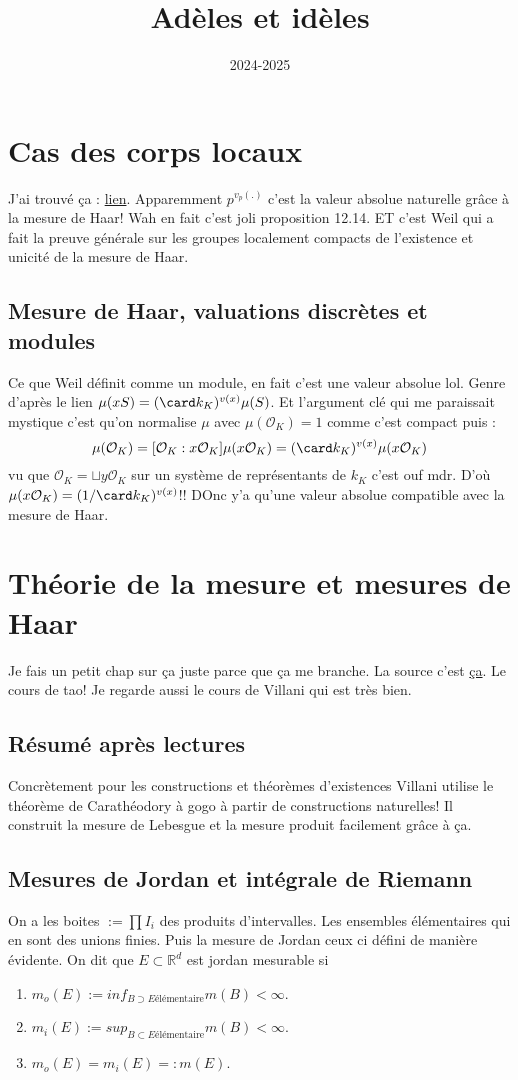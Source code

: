 \documentclass[a4paper,12pt]{book}
\title{Adèles et idèles}
\date{2024-2025}
\newcommand{\R}{\mathbb{R}}
\newcommand{\Or}{\mathcal{O}}
\theoremstyle{plain}
\theoremstyle{definition}
\theoremstyle{remark}
\begin{document}
\maketitle
\tableofcontents

\chapter{Cas des corps locaux}
J'ai trouvé ça : \href{https://math.mit.edu/classes/18.785/2015fa/LectureNotes12.pdf}{lien}.
Apparemment $p^{v_p(.)}$ c'est la valeur absolue naturelle grâce
à la mesure de Haar! Wah en fait c'est joli proposition 12.14. ET
c'est Weil qui a fait la preuve générale sur les groupes localement
compacts de l'existence et unicité de la mesure de Haar.
\section{Mesure de Haar, valuations discrètes et modules}
Ce que Weil définit comme un module, en fait c'est une valeur
absolue lol. Genre d'après le lien 
$\mu(xS)=(\card k_K)^{v(x)}\mu(S)$. Et l'argument clé qui me
paraissait mystique c'est qu'on normalise $\mu$ avec $\mu(\Or_K)=1$
comme c'est compact puis :
\[\mu(\Or_K)=[\Or_K:x\Or_K]\mu(x\Or_K)=(\card k_K)^{v(x)}\mu(x\Or_K)\]
vu que $\Or_K=\sqcup y\Or_K$ sur un système de représentants de
$k_K$ c'est ouf mdr. D'où $\mu(x\Or_K)=(1/\card k_K)^{v(x)}$!!
DOnc y'a qu'une valeur absolue compatible avec la mesure de Haar.


\chapter{Théorie de la mesure et mesures de Haar}
Je fais un petit chap sur ça juste parce que ça me branche.
La source c'est \href{https://terrytao.wordpress.com/wp-content/uploads/2012/12/gsm-126-tao5-measure-book.pdf}{ça}.
Le cours de tao! Je regarde aussi le cours de Villani qui est très
bien.
\section{Résumé après lectures}
Concrètement pour les constructions et théorèmes d'existences 
Villani utilise le théorème de Carathéodory à gogo à partir
de constructions naturelles! Il construit la mesure de Lebesgue
et la mesure produit facilement grâce à ça.

\section{Mesures de Jordan et intégrale de Riemann}
On a les boites $:=\prod I_i$ des produits d'intervalles. 
Les ensembles élémentaires qui en sont des unions finies.
Puis la mesure de Jordan ceux ci défini de manière évidente.
On dit que $E\subset \R^d$ est jordan mesurable si 
\begin{enumerate}
  \item $m_o(E):=inf_{B\supset E \textrm{élémentaire}} m(B)<\infty$.
  \item $m_i(E):=sup_{B\subset E \textrm{élémentaire}} m(B)<\infty$.
  \item $m_o(E)=m_i(E)=: m(E)$.
\end{enumerate}
\end{document}
